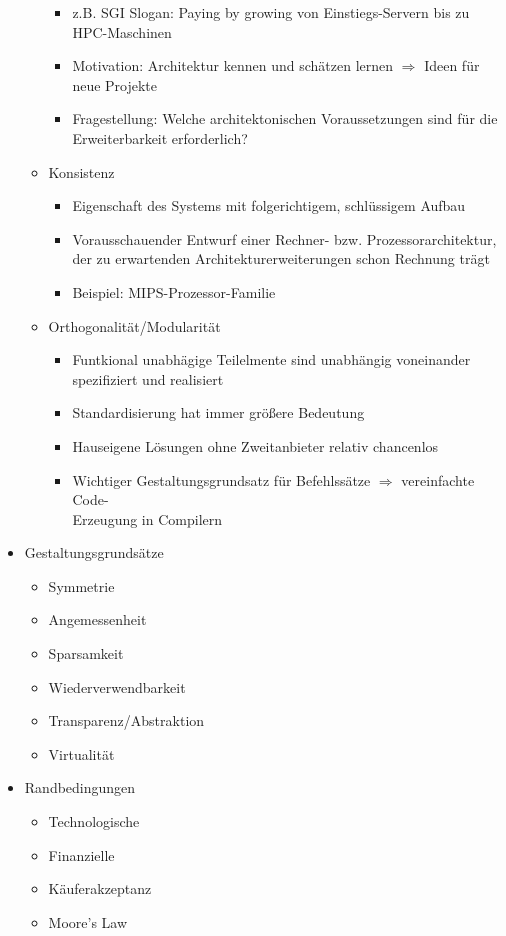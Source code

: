 \begin{itemize}
\begin{itemize}
\begin{itemize}
			\item z.B. SGI Slogan: Paying by growing von Einstiegs-Servern bis zu HPC-Maschinen
			\item Motivation: Architektur kennen und schätzen lernen \(\Rightarrow\) Ideen für neue Projekte
			\item Fragestellung: Welche architektonischen Voraussetzungen sind für die Erweiterbarkeit erforderlich?
		\end{itemize}
		\item  Konsistenz
		\begin{itemize}
			\item Eigenschaft des Systems mit folgerichtigem, schlüssigem Aufbau
			\item Vorausschauender Entwurf einer Rechner- bzw. Prozessorarchitektur, der zu erwartenden Architekturerweiterungen schon Rechnung trägt
			\item Beispiel: MIPS-Prozessor-Familie
		\end{itemize}
		\item Orthogonalität/Modularität
		\begin{itemize}
			\item Funtkional unabhägige Teilelmente sind unabhängig voneinander spezifiziert und realisiert
			\item Standardisierung hat immer größere Bedeutung 
			\item Hauseigene Lösungen ohne Zweitanbieter relativ chancenlos
			\item Wichtiger Gestaltungsgrundsatz für Befehlssätze \(\Rightarrow\) vereinfachte Code- \\Erzeugung in Compilern
		\end{itemize}
	\end{itemize}
	\item Gestaltungsgrundsätze
	\begin{itemize}
		\item Symmetrie
		\item Angemessenheit
		\item Sparsamkeit
		\item Wiederverwendbarkeit
		\item Transparenz/Abstraktion
		\item Virtualität
	\end{itemize}
	\item Randbedingungen
	\begin{itemize}
		\item Technologische
		\item Finanzielle
		\item Käuferakzeptanz
		\item Moore's Law
	\end{itemize}
\end{itemize}

